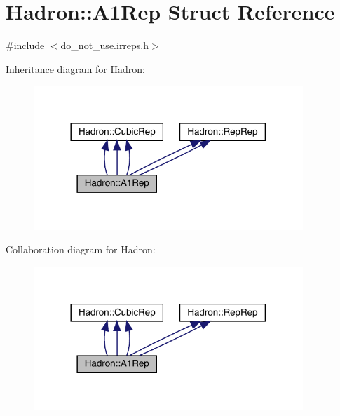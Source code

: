 \hypertarget{structHadron_1_1A1Rep}{}\section{Hadron\+:\+:A1\+Rep Struct Reference}
\label{structHadron_1_1A1Rep}


{\ttfamily \#include $<$do\+\_\+not\+\_\+use.\+irreps.\+h$>$}



Inheritance diagram for Hadron\+:
\nopagebreak
\begin{figure}[H]
\begin{center}
\leavevmode
\includegraphics[width=288pt]{d7/dde/structHadron_1_1A1Rep__inherit__graph}
\end{center}
\end{figure}


Collaboration diagram for Hadron\+:
\nopagebreak
\begin{figure}[H]
\begin{center}
\leavevmode
\includegraphics[width=288pt]{dd/de0/structHadron_1_1A1Rep__coll__graph}
\end{center}
\end{figure}
